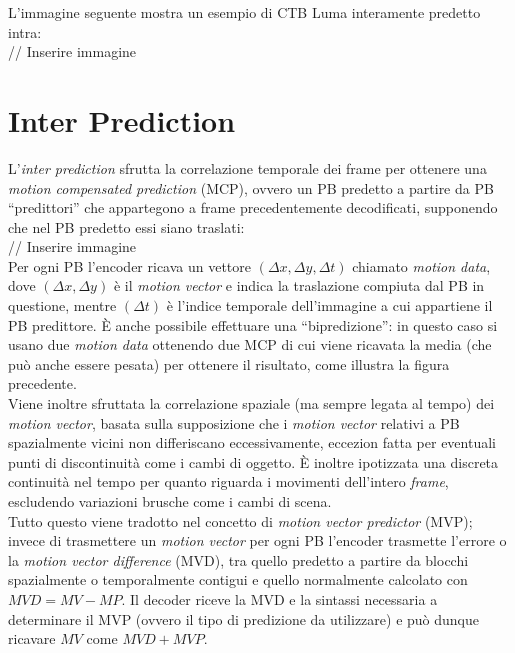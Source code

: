 L'immagine seguente mostra un esempio di CTB Luma interamente predetto intra: \\

// Inserire immagine

\section{Inter Prediction}
L'\emph{inter prediction} sfrutta la correlazione temporale dei frame per 
ottenere una \emph{motion compensated prediction} (MCP), ovvero un PB predetto 
a partire da PB ``predittori'' che appartegono a frame precedentemente 
decodificati, supponendo che nel PB predetto essi siano traslati: 
\\
// Inserire immagine
\\
Per ogni PB l'encoder ricava un vettore ${(\Delta x,\Delta y,\Delta t)}$ 
chiamato \emph{motion data}, dove ${(\Delta x,\Delta y)}$ è il 
\emph{motion vector} e indica la traslazione compiuta dal PB in questione, 
mentre ${(\Delta t)}$ è l'indice temporale dell'immagine a cui appartiene il PB 
predittore.
È anche possibile effettuare una ``bipredizione'': in questo caso si usano 
due \emph{motion data} ottenendo due MCP di cui viene ricavata la media (che 
può anche essere pesata) per ottenere il risultato, come illustra la figura 
precedente.
\\
Viene inoltre sfruttata la correlazione spaziale (ma sempre legata al tempo) 
dei \emph{motion vector}, basata sulla supposizione che i \emph{motion vector} 
relativi a PB spazialmente vicini non differiscano eccessivamente, eccezion 
fatta per eventuali punti di discontinuità come i cambi di oggetto. È inoltre 
ipotizzata una discreta continuità nel tempo per quanto riguarda i movimenti 
dell'intero \emph{frame}, escludendo variazioni brusche come i cambi di scena.
\\
Tutto questo viene tradotto nel concetto di \emph{motion vector predictor} 
(MVP); invece di trasmettere un \emph{motion vector} per ogni PB l'encoder 
trasmette l'errore o la \emph{motion vector difference} (MVD), tra quello 
predetto a partire da blocchi spazialmente o temporalmente contigui e quello 
normalmente calcolato con $MVD=MV-MP$.
Il decoder riceve la MVD e la sintassi necessaria a determinare il MVP (ovvero 
il tipo di predizione da utilizzare) e può dunque ricavare $MV$ come $MVD+MVP$.
 
